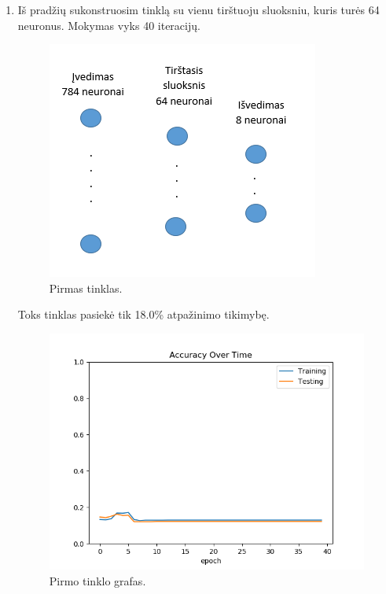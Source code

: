 \documentclass{VUMIFInfKursinis}
\begin{document}
\begin{enumerate}
    \item Iš pradžių sukonstruosim tinklą su vienu tirštuoju sluoksniu, kuris turės 64 neuronus. Mokymas vyks 40 iteracijų.
      
    \begin{figure}[h!]
    \centering
    \includegraphics[scale=0.8]{img/tinklas1}
    \caption{Pirmas tinklas.}
    \label{fig:tinklas1}
    \end{figure}
    
    Toks tinklas pasiekė tik 18.0\% atpažinimo tikimybę.
      
    \begin{figure}[h!]
    \centering
    \includegraphics[scale=0.6]{img/grafas1}
    \caption{Pirmo tinklo grafas.}
    \label{fig:grafas1}
    \end{figure}



\end{enumerate}
\end{document}
